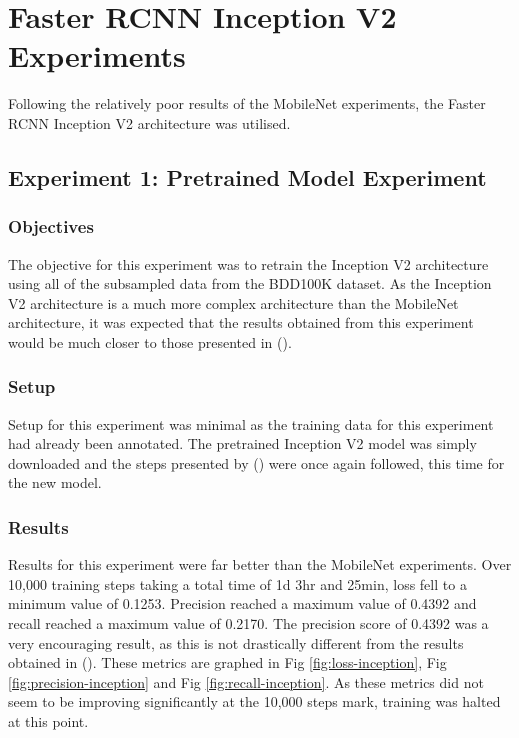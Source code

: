 \documentclass[12pt]{report}
\begin{document}
\newpage
\section{Faster RCNN Inception V2 Experiments}
\begin{flushleft}
Following the relatively poor results of the MobileNet experiments, the Faster RCNN Inception V2 architecture was utilised.
\end{flushleft}

\subsection{Experiment 1: Pretrained Model Experiment}
\subsubsection*{Objectives}
\begin{flushleft}
The objective for this experiment was to retrain the Inception V2 architecture using all of the subsampled data from the BDD100K dataset. As the Inception V2 architecture is a much more complex architecture than the MobileNet architecture, it was expected that the results obtained from this experiment would be much closer to those presented in (\cite{yu2018bdd100k}).
\end{flushleft}

\subsubsection*{Setup}
\begin{flushleft}
Setup for this experiment was minimal as the training data for this experiment had already been annotated. The pretrained Inception V2 model was simply downloaded and the steps presented by (\cite{tutorial}) were once again followed, this time for the new model.
\end{flushleft}

\subsubsection*{Results}
\begin{flushleft}
Results for this experiment were far better than the MobileNet experiments. Over 10,000 training steps taking a total time of 1d 3hr and 25min, loss fell to a minimum value of 0.1253. Precision reached a maximum value of 0.4392 and recall reached a maximum value of 0.2170. The precision score of 0.4392 was a very encouraging result, as this is not drastically different from the results obtained in (\cite{yu2018bdd100k}). These metrics are graphed in Fig \ref{fig:loss-inception}, Fig \ref{fig:precision-inception} and Fig \ref{fig:recall-inception}. As these metrics did not seem to be improving significantly at the 10,000 steps mark, training was halted at this point.
\end{flushleft}
\end{document}
